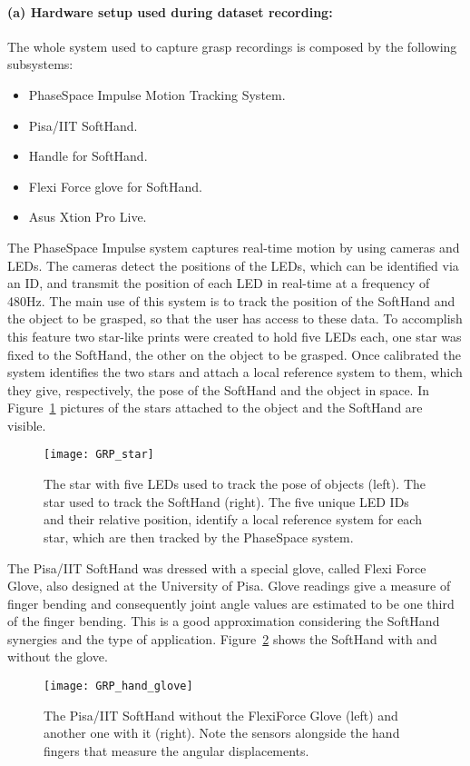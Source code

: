 \paragraph{(a) Hardware setup used during dataset recording:}
The whole system used to capture grasp recordings is composed by the following subsystems:
\begin{itemize}
  \item PhaseSpace Impulse Motion Tracking System.
  \item Pisa/IIT SoftHand.
  \item Handle for SoftHand.
  \item Flexi Force glove for SoftHand.
  \item Asus Xtion Pro Live.
\end{itemize}

The PhaseSpace Impulse system captures real-time motion by using cameras and LEDs.
The cameras detect the positions of the LEDs, which can be identified via an ID, and transmit the position of each LED in real-time at a frequency of 480Hz.
The main use of this system is to track the position of the SoftHand and the object to be grasped, so that the user has access to these data. 
To accomplish this feature two star-like prints were created to hold five LEDs each, one star was fixed to the SoftHand, the other on the object to be grasped.
Once calibrated the system identifies the two stars and attach a local reference system to them, which they give, respectively, the pose of the SoftHand and the object in space. %
In Figure~\ref{fig:grasp:star} pictures of the stars attached to the object and the SoftHand are visible.
\begin{figure}[b!]
  \centering
  \texttt{[image: GRP\_star]}
  \caption{The star with five LEDs used to track the pose of objects (left). The star used to track the SoftHand (right). The five unique LED IDs and their relative position, identify a local reference system for each star, which are then tracked by the PhaseSpace system.}
  \label{fig:grasp:star}
\end{figure}

The Pisa/IIT SoftHand was dressed with a special glove, called Flexi Force Glove, also designed at the University of Pisa.
Glove readings give a measure of finger bending and consequently joint angle values are estimated to be one third of the finger bending. This is a good approximation considering 
the SoftHand synergies and the type of application. Figure~\ref{fig:grasp:hand_glove} shows the SoftHand with and without the glove.
\begin{figure}[tbh!]
  \centering
  \texttt{[image: GRP\_hand\_glove]}
  \caption{The Pisa/IIT SoftHand without the FlexiForce Glove (left) and another one with it (right). Note the sensors alongside the hand fingers that measure the angular displacements.}
  \label{fig:grasp:hand_glove}
\end{figure}

